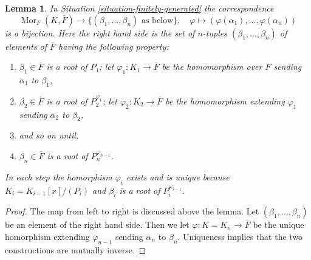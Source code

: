 \documentclass[10pt,a4paper]{amsart}
\theoremstyle{plain}
\newtheorem{lemma}[subsection]{Lemma}
\theoremstyle{definition}
\theoremstyle{remark}
\numberwithin{equation}{subsection}
\def\Mor{\mathop{\mathrm{Mor}}\nolimits}
\begin{document}
\begin{lemma}
\label{lemma-count-embeddings}
In Situation \ref{situation-finitely-generated} the correspondence
$$
\Mor_F(K, \overline{F})
\longrightarrow
\{(\beta_1, \ldots, \beta_n)\text{ as below}\},
\quad
\varphi \longmapsto (\varphi(\alpha_1), \ldots, \varphi(\alpha_n))
$$
is a bijection. Here the right hand side is the set of $n$-tuples
$(\beta_1, \ldots, \beta_n)$ of elements of $\overline{F}$ having
the following property:
\begin{enumerate}
\item $\beta_1 \in \overline{F}$ is a root of $P_1$;
let $\varphi_1 : K_1 \to \overline{F}$ be the homomorphism
over $F$ sending $\alpha_1$ to $\beta_1$,
\item $\beta_2 \in \overline{F}$ is a root of $P_2^{\varphi_1}$;
let $\varphi_2 : K_2 \to \overline{F}$ be the homomorphism
extending $\varphi_1$ sending $\alpha_2$ to $\beta_2$,
\item and so on until,
\item $\beta_n \in \overline{F}$ is a root of $P_n^{\varphi_{n - 1}}$.
\end{enumerate}
In each step the homorphism $\varphi_i$ exists and is unique because
$K_i = K_{i - 1}[x]/(P_i)$ and $\beta_i$ is a root of $P_i^{\varphi_{i - 1}}$.
\end{lemma}

\begin{proof}
The map from left to right is discussed above the lemma.
Let $(\beta_1, \ldots, \beta_n)$ be an element of the right hand side.
Then we let $\varphi : K = K_n \to \overline{F}$ be the unique homorphism
extending $\varphi_{n - 1}$ sending $\alpha_n$ to $\beta_n$.
Uniqueness implies that the two constructions are mutually inverse.
\end{proof}
\end{document}
